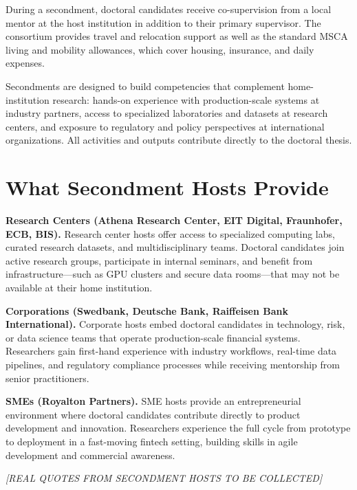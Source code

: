 During a secondment, doctoral candidates receive co-supervision from a local
mentor at the host institution in addition to their primary supervisor.  The
consortium provides travel and relocation support as well as the standard MSCA
living and mobility allowances, which cover housing, insurance, and daily
expenses.

Secondments are designed to build competencies that complement home-institution
research: hands-on experience with production-scale systems at industry
partners, access to specialized laboratories and datasets at research centers,
and exposure to regulatory and policy perspectives at international
organizations.  All activities and outputs contribute directly to the doctoral
thesis.

\section{What Secondment Hosts Provide}
\label{sec:secondment-hosts}

\textbf{Research Centers (Athena Research Center, EIT Digital, Fraunhofer, ECB, BIS).}\quad
Research center hosts offer access to specialized computing labs, curated
research datasets, and multidisciplinary teams.  Doctoral candidates join
active research groups, participate in internal seminars, and benefit from
infrastructure---such as GPU clusters and secure data rooms---that may not be
available at their home institution.

\textbf{Corporations (Swedbank, Deutsche Bank, Raiffeisen Bank International).}\quad
Corporate hosts embed doctoral candidates in technology, risk, or data science
teams that operate production-scale financial systems.  Researchers gain
first-hand experience with industry workflows, real-time data pipelines, and
regulatory compliance processes while receiving mentorship from senior
practitioners.

\textbf{SMEs (Royalton Partners).}\quad
SME hosts provide an entrepreneurial environment where doctoral candidates
contribute directly to product development and innovation.  Researchers
experience the full cycle from prototype to deployment in a fast-moving
fintech setting, building skills in agile development and commercial
awareness.

\vspace{4pt}
{\itshape\color{mscaGrey}[REAL QUOTES FROM SECONDMENT HOSTS TO BE COLLECTED]}

\vspace{8pt}

